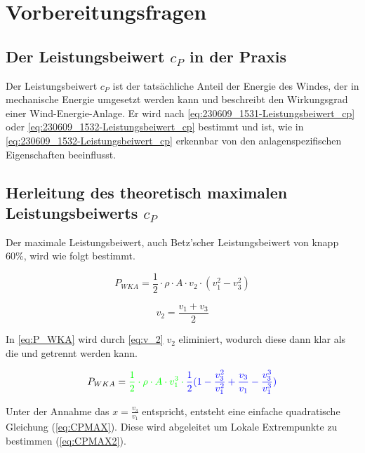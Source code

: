 \section{Vorbereitungsfragen}
\subsection{Der Leistungsbeiwert \texorpdfstring{$c_P$}{} in der Praxis}
Der Leistungsbeiwert $c_P$ ist der tatsächliche Anteil der Energie des Windes, der in mechanische Energie umgesetzt werden kann und beschreibt den Wirkungsgrad einer Wind-Energie-Anlage. Er wird nach \autoref{eq:230609_1531-Leistungsbeiwert_cp} oder \autoref{eq:230609_1532-Leistungsbeiwert_cp} bestimmt und ist, wie in \ref{eq:230609_1532-Leistungsbeiwert_cp} erkennbar von den anlagenspezifischen Eigenschaften beeinflusst.



\subsection{Herleitung des theoretisch maximalen Leistungsbeiwerts \texorpdfstring{$c_P$}{} }
Der maximale Leistungsbeiwert, auch Betz'scher Leistungsbeiwert von knapp 60\%, wird wie folgt bestimmt.

\begin{equation}
P_{WKA}= \frac{1}{2} \cdot \rho \cdot A \cdot v_2 \cdot (v_1^2 - v_3^2)
\label{eq:P_WKA} 
\end{equation}

\begin{equation}
v_2= \frac{v_1+v_3}{2} 
\label{eq:v_2} 
\end{equation}

In \autoref{eq:P_WKA} wird durch \autoref{eq:v_2} $v_2$ eliminiert, wodurch diese dann klar als die \color{green}{Leistung des Windes}\color{black}{} und \color{blue}{Leistungsbeiwert} \color{black}{} getrennt werden kann. 

\begin{equation}
P_{WKA}= \color{green}{\frac{1}{2} \cdot \rho \cdot A \cdot v_1^3 } \cdot \color{blue}{\frac{1}{2} (1-\frac{v_3^2}{v_1^2} + \frac{v_3}{v_1} - \frac{v_3^3}{v_1^3}})\color{black}{}
\label{eq:P_WKA2} 
\end{equation}



Unter der Annahme das $x=\frac{v_3}{v_1}$ entspricht, entsteht eine einfache quadratische Gleichung (\ref{eq:CPMAX}). Diese wird abgeleitet um Lokale Extrempunkte zu bestimmen (\autoref{eq:CPMAX2}). 

